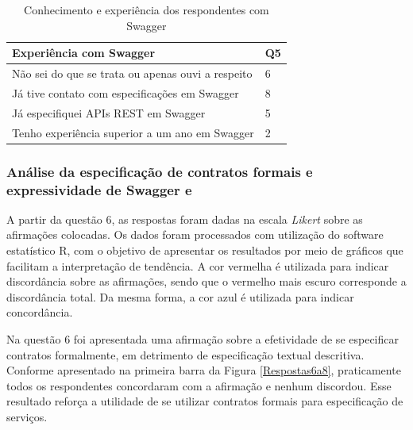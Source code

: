 \begin{table}[!bth] 
\centering
\scriptsize
\begin{tabular}{p{6cm}|p{1cm}}
\hline   
Experiência com Swagger & Q5 \\
\hline   
Não sei do que se trata ou apenas ouvi a respeito & 6 \\
Já tive contato com especificações em Swagger & 8 \\ 
Já especifiquei APIs REST em Swagger &  5  \\
Tenho experiência superior a um ano em Swagger & 2 \\


\end{tabular}
\caption{Conhecimento e experiência dos respondentes com Swagger}
\label{quantidadeRespostas5}
\end{table}

  
   

\subsubsection{Análise da especificação de contratos formais e expressividade
de Swagger e \neoidl{}}

A partir da questão 6, as respostas foram dadas na escala \textit{Likert} sobre
as afirmações colocadas. Os dados foram processados com utilização do software
estatístico R, com o objetivo de apresentar os resultados por meio de gráficos
que facilitam a interpretação de tendência. A cor vermelha é utilizada para
indicar discordância sobre as afirmações, sendo que o vermelho mais escuro
corresponde a discordância total. Da mesma forma, a cor azul é utilizada para
indicar concordância.

Na questão 6 foi apresentada uma afirmação sobre a efetividade de se especificar
contratos formalmente, em detrimento de especificação textual descritiva.
Conforme apresentado na primeira barra da Figura \ref{Respostas6a8},
praticamente todos os respondentes concordaram com a afirmação e nenhum
discordou. Esse resultado reforça a utilidade de se utilizar contratos
formais para especificação de serviços.


